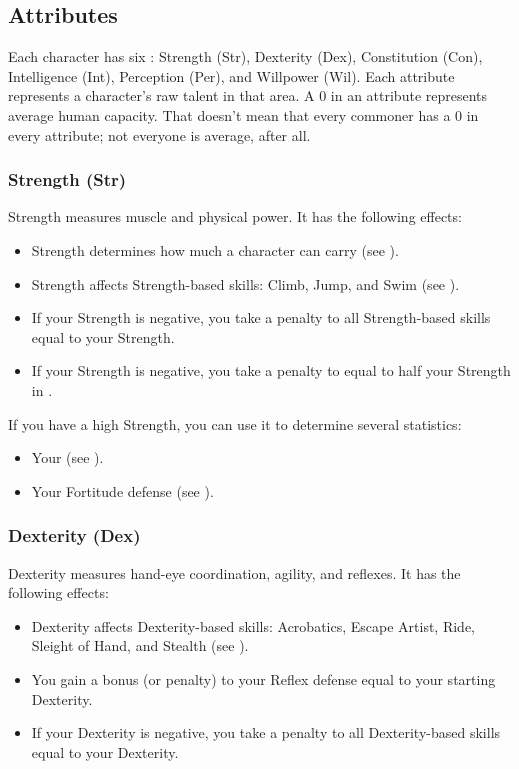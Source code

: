     \subsection{Attributes}\label{Attributes}

        Each character has six : Strength (Str), Dexterity (Dex), Constitution (Con), Intelligence (Int), Perception (Per), and Willpower (Wil).
        Each attribute represents a character's raw talent in that area.
        A 0 in an attribute represents average human capacity.
        That doesn't mean that every commoner has a 0 in every attribute; not everyone is average, after all.

        \subsubsection{Strength (Str)}\label{Strength}
            Strength measures muscle and physical power.
            It has the following effects:
            \begin{itemize}
                \item Strength determines how much a character can carry (see ).
                \item Strength affects Strength-based skills: Climb, Jump, and Swim (see ).
                \item If your Strength is negative, you take a penalty to all Strength-based skills equal to your Strength.
                \item If your Strength is negative, you take a penalty to  equal to half your Strength in .
            \end{itemize}

            If you have a high Strength, you can use it to determine several statistics:
            \begin{itemize}
                \item Your  (see ).
                \item Your Fortitude defense (see ).
            \end{itemize}

        \subsubsection{Dexterity (Dex)}\label{Dexterity}
            Dexterity measures hand-eye coordination, agility, and reflexes.
            It has the following effects:
            \begin{itemize}
                \item Dexterity affects Dexterity-based skills: Acrobatics, Escape Artist, Ride, Sleight of Hand, and Stealth (see ).
                \item You gain a bonus (or penalty) to your Reflex defense equal to your starting Dexterity.
                \item If your Dexterity is negative, you take a penalty to all Dexterity-based skills equal to your Dexterity.
            \end{itemize}


